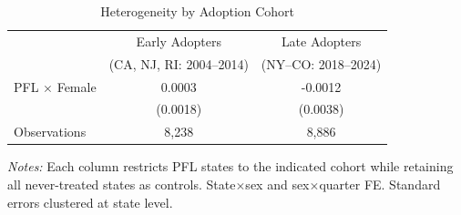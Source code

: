 \begin{table}[htbp]
\begin{threeparttable}
\centering
\caption{Heterogeneity by Adoption Cohort}
\label{tab:heterogeneity}
\begin{tabular}{lcc}
\toprule
 & Early Adopters & Late Adopters \\
 & (CA, NJ, RI: 2004--2014) & (NY--CO: 2018--2024) \\
\midrule
PFL $\times$ Female & 0.0003 & -0.0012 \\
 & (0.0018) & (0.0038) \\
Observations & 8,238 & 8,886 \\
\bottomrule
\end{tabular}
\begin{tablenotes}
\item \textit{Notes:} Each column restricts PFL states to the indicated cohort while retaining all never-treated states as controls. State$\times$sex and sex$\times$quarter FE. Standard errors clustered at state level.
\end{tablenotes}
\end{threeparttable}
\end{table}
